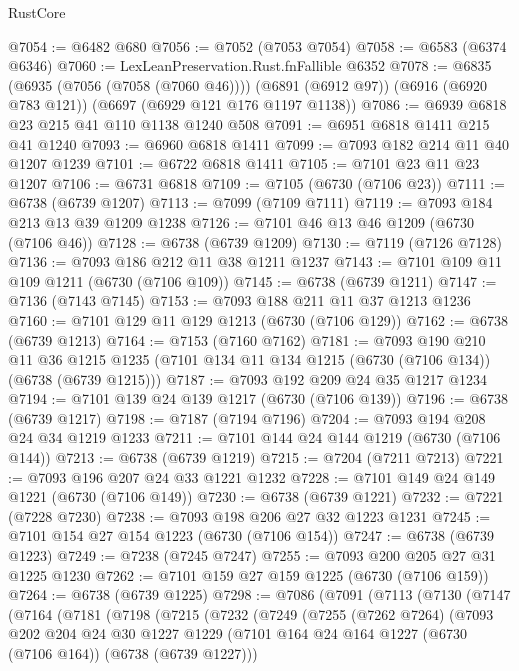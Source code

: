 \begin{lexlean}{RustCore}
\begin{coremodule}
@7054 := @6482 @680
@7056 := @7052 (@7053 @7054)
@7058 := @6583 (@6374 @6346)
@7060 := LexLeanPreservation.Rust.fnFallible @6352
@7078 := @6835
    (@6935 (@7056 (@7058 (@7060 @46))))
    (@6891 (@6912 @97))
    (@6916 (@6920 @783 @121))
    (@6697 (@6929 @121 @176 @1197 @1138))
@7086 := @6939 @6818 @23 @215 @41 @110 @1138 @1240 @508
@7091 := @6951 @6818 @1411 @215 @41 @1240
@7093 := @6960 @6818 @1411
@7099 := @7093 @182 @214 @11 @40 @1207 @1239
@7101 := @6722 @6818 @1411
@7105 := @7101 @23 @11 @23 @1207
@7106 := @6731 @6818
@7109 := @7105 (@6730 (@7106 @23))
@7111 := @6738 (@6739 @1207)
@7113 := @7099 (@7109 @7111)
@7119 := @7093 @184 @213 @13 @39 @1209 @1238
@7126 := @7101 @46 @13 @46 @1209 (@6730 (@7106 @46))
@7128 := @6738 (@6739 @1209)
@7130 := @7119 (@7126 @7128)
@7136 := @7093 @186 @212 @11 @38 @1211 @1237
@7143 := @7101 @109 @11 @109 @1211 (@6730 (@7106 @109))
@7145 := @6738 (@6739 @1211)
@7147 := @7136 (@7143 @7145)
@7153 := @7093 @188 @211 @11 @37 @1213 @1236
@7160 := @7101 @129 @11 @129 @1213 (@6730 (@7106 @129))
@7162 := @6738 (@6739 @1213)
@7164 := @7153 (@7160 @7162)
@7181 := @7093
    @190
    @210
    @11
    @36
    @1215
    @1235
    (@7101 @134 @11 @134 @1215 (@6730 (@7106 @134)) (@6738 (@6739 @1215)))
@7187 := @7093 @192 @209 @24 @35 @1217 @1234
@7194 := @7101 @139 @24 @139 @1217 (@6730 (@7106 @139))
@7196 := @6738 (@6739 @1217)
@7198 := @7187 (@7194 @7196)
@7204 := @7093 @194 @208 @24 @34 @1219 @1233
@7211 := @7101 @144 @24 @144 @1219 (@6730 (@7106 @144))
@7213 := @6738 (@6739 @1219)
@7215 := @7204 (@7211 @7213)
@7221 := @7093 @196 @207 @24 @33 @1221 @1232
@7228 := @7101 @149 @24 @149 @1221 (@6730 (@7106 @149))
@7230 := @6738 (@6739 @1221)
@7232 := @7221 (@7228 @7230)
@7238 := @7093 @198 @206 @27 @32 @1223 @1231
@7245 := @7101 @154 @27 @154 @1223 (@6730 (@7106 @154))
@7247 := @6738 (@6739 @1223)
@7249 := @7238 (@7245 @7247)
@7255 := @7093 @200 @205 @27 @31 @1225 @1230
@7262 := @7101 @159 @27 @159 @1225 (@6730 (@7106 @159))
@7264 := @6738 (@6739 @1225)
@7298 := @7086
    (@7091
      (@7113
        (@7130
          (@7147
            (@7164
              (@7181
                (@7198
                  (@7215
                    (@7232
                      (@7249
                        (@7255
                          (@7262 @7264)
                          (@7093
                            @202
                            @204
                            @24
                            @30
                            @1227
                            @1229
                            (@7101 @164 @24 @164 @1227 (@6730 (@7106 @164)) (@6738 (@6739 @1227)))

\end{coremodule}
\end{lexlean}
